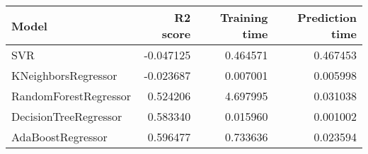 \begin{tabular}{lrrr}
\toprule
Model & R2 score & Training time & Prediction time \\
\midrule
SVR & -0.047125 & 0.464571 & 0.467453 \\
KNeighborsRegressor & -0.023687 & 0.007001 & 0.005998 \\
RandomForestRegressor & 0.524206 & 4.697995 & 0.031038 \\
DecisionTreeRegressor & 0.583340 & 0.015960 & 0.001002 \\
AdaBoostRegressor & 0.596477 & 0.733636 & 0.023594 \\
\bottomrule
\end{tabular}
